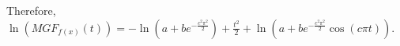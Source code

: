 \documentclass[letterpaper]{article}
\begin{document}

Therefore, $\ln(MGF_{f(x)}(t)) = -\ln(a + be^{-\frac{c^{2}\pi^{2}}{2}}) + \frac{t^2}{2} + \ln(a + be^{-\frac{c^{2}\pi^{2}}{2}}\cos(c\pi t))$.
\end{document}
